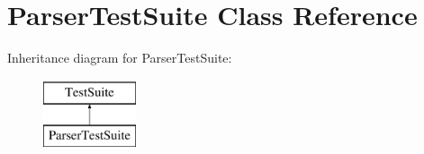 \hypertarget{classParserTestSuite}{\section{Parser\-Test\-Suite Class Reference}
\label{classParserTestSuite}
}
Inheritance diagram for Parser\-Test\-Suite\-:\begin{figure}[H]
\begin{center}
\leavevmode
\includegraphics[height=2.000000cm]{classParserTestSuite}
\end{center}
\end{figure}
